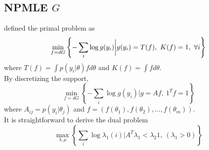 \documentclass[12pt]{article}
\begin{document}
\subsection{NPMLE $G$}
\citet{koenker2014convex} defined the primal problem as
\begin{equation*}
    \min_{f=dG}\left\{-\sum_i \log g(y_i)\bigg |g(y_i) = T(f),\ K(f)=1,\ \forall i \right\}
\end{equation*}
where $ T(f)=\int p(y_i |\theta)fd\theta $ and  $K(f)= \int f d\theta$.\\
By discretizing the support,
\begin{equation*}
    \min_{f=dG}\left\{-\sum_i \log g(y_i)\bigg |g=Af,\ {1^T}f=1\right\}
\end{equation*}
where $A_{ij}= p(y_i|\theta_j) $ and $ f = (f(\theta_1),f(\theta_2),\ldots,f(\theta_m))$.\\
It is straightforward to derive the dual problem
\begin{equation*}
    \max_{\lambda,\mu} \left\{ \sum_i \log \lambda_1(i) \bigg| A^T\lambda_1 < \lambda_2 1,\ (\lambda_1>0) \right\}
\end{equation*}
\end{document}
